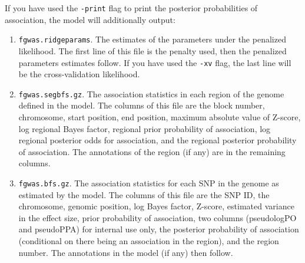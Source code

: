 \documentclass[11pt,titlepage]{article}
\begin{document}
If you have used the \texttt{-print} flag to print the posterior probabilities of association, the model will additionally output:
\begin{enumerate}
\item \texttt{fgwas.ridgeparams}. The estimates of the parameters under the penalized likelihood. The first line of this file is the penalty used, then the penalized parameters estimates follow. If you have used the \texttt{-xv} flag, the last line will be the cross-validation likelihood.
\item \texttt{fgwas.segbfs.gz}. The association statistics in each region of the genome defined in the model. The columns of this file are the block number, chromosome, start position, end position, maximum absolute value of Z-score, log regional Bayes factor, regional prior probability of association, log regional posterior odds for association, and the regional posterior probability of association. The annotations of the region (if any) are in the remaining columns. 
\item \texttt{fgwas.bfs.gz}. The association statistics for each SNP in the genome as estimated by the model. The columns of this file are the SNP ID, the chromosome, genomic position, log Bayes factor, Z-score, estimated variance in the effect size, prior probability of association, two columns (pseudologPO and pseudoPPA) for internal use only, the posterior probability of association (conditional on there being an association in the region), and the region number. The annotations in the model (if any) then follow. 
\end{enumerate}
\end{document}
